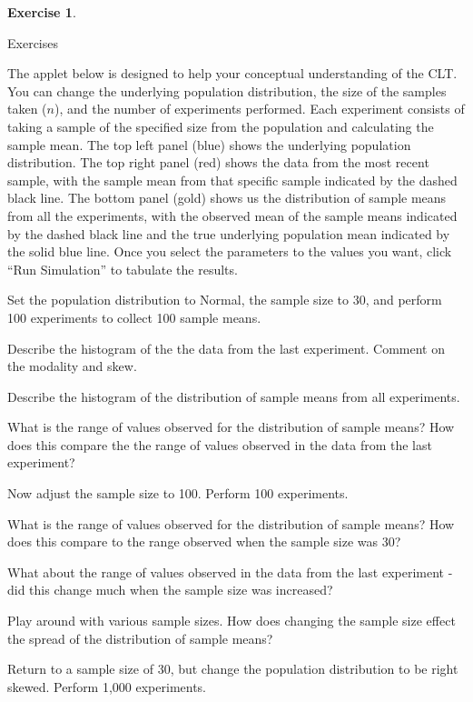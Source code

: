 \documentclass[
]{book}
\theoremstyle{definition}
\theoremstyle{definition}
\theoremstyle{definition}
\newtheorem{exercise}{Exercise}[chapter]
\theoremstyle{remark}
\begin{document}
\begin{exercise}
\protect\hypertarget{exr:unlabeled-div-6}{}\label{exr:unlabeled-div-6}

Exercises

\end{exercise}

The applet below is designed to help your conceptual understanding of the CLT. You can change the underlying population distribution, the size of the samples taken (\(n\)), and the number of experiments performed. Each experiment consists of taking a sample of the specified size from the population and calculating the sample mean. The top left panel (blue) shows the underlying population distribution. The top right panel (red) shows the data from the most recent sample, with the sample mean from that specific sample indicated by the dashed black line. The bottom panel (gold) shows us the distribution of sample means from all the experiments, with the observed mean of the sample means indicated by the dashed black line and the true underlying population mean indicated by the solid blue line. Once you select the parameters to the values you want, click ``Run Simulation'' to tabulate the results.

Set the population distribution to Normal, the sample size to 30, and perform 100 experiments to collect 100 sample means.

Describe the histogram of the the data from the last experiment. Comment on the modality and skew.

Describe the histogram of the distribution of sample means from all experiments.

What is the range of values observed for the distribution of sample means? How does this compare the the range of values observed in the data from the last experiment?

Now adjust the sample size to 100. Perform 100 experiments.

What is the range of values observed for the distribution of sample means? How does this compare to the range observed when the sample size was 30?

What about the range of values observed in the data from the last experiment - did this change much when the sample size was increased?

Play around with various sample sizes. How does changing the sample size effect the spread of the distribution of sample means?

Return to a sample size of 30, but change the population distribution to be right skewed. Perform 1,000 experiments.
\end{document}
